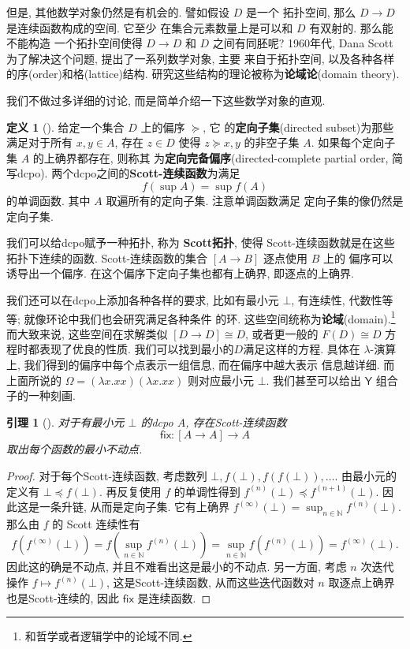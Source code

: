 \documentclass[UTF8]{ctexbook}
\newcommand{\cons}[1]{\textsf{#1}}
\theoremstyle{plain}
\newtheorem{lemma}{引理}[chapter]
\theoremstyle{definition}
\newtheorem{definition}{定义}[chapter]
\theoremstyle{remark}
\begin{document}
但是, 其他数学对象仍然是有机会的. 譬如假设 \(D\) 是一个
拓扑空间, 那么 \(D \to D\) 是连续函数构成的空间. 它至少
在集合元素数量上是可以和 \(D\) 有双射的. 那么能不能构造
一个拓扑空间使得 \(D \to D\) 和 \(D\) 之间有同胚呢?
1960年代, Dana Scott 为了解决这个问题, 提出了一系列数学对象, 主要
来自于拓扑空间, 以及各种各样的序(order)和格(lattice)结构.
研究这些结构的理论被称为\textbf{论域论}(domain theory).

我们不做过多详细的讨论, 而是简单介绍一下这些数学对象的直观.
\begin{definition}[{\cite[\S\S2.1.5--2.1.6]{abramsky:1995:domain}}]
给定一个集合 \(D\) 上的偏序 \(\succeq\), 它
的\textbf{定向子集}(directed subset)为那些满足对于所有 \(x,y\in A\),
存在 \(z \in D\) 使得 \(z \succeq x, y\) 的非空子集
\(A\). 如果每个定向子集 \(A\) 的上确界都存在, 则称其
为\textbf{定向完备偏序}(directed-complete partial order, 简写dcpo).
两个dcpo之间的\textbf{Scott-连续函数}为满足
\[f\left(\sup A\right) = \sup f(A)\]
的单调函数. 其中 \(A\) 取遍所有的定向子集. 注意单调函数满足
定向子集的像仍然是定向子集.
\end{definition}
我们可以给dcpo赋予一种拓扑, 称为 \textbf{Scott拓扑},
使得 Scott-连续函数就是在这些拓扑下连续的函数.
Scott-连续函数的集合 \([A \to B]\) 逐点使用 \(B\) 上的
偏序可以诱导出一个偏序. 在这个偏序下定向子集也都有上确界,
即逐点的上确界.

我们还可以在dcpo上添加各种各样的要求, 比如有最小元 \(\bot\),
有连续性, 代数性等等; 就像环论中我们也会研究满足各种条件
的环. 这些空间统称为\textbf{论域}(domain).\footnote{和哲学或者逻辑学中的论域不同.}
而大致来说, 这些空间在求解类似 \([D \to D] \cong D\),
或者更一般的 \(F(D) \cong D\) 方程时都表现了优良的性质.
我们可以找到最小的\(D\)满足这样的方程. 具体在 \(\lambda\)-演算
上, 我们得到的偏序中每个点表示一组信息, 而在偏序中越大表示
信息越详细. 而上面所说的 \(\Omega = (\lambda x. xx) (\lambda x.xx)\)
则对应最小元 \(\bot\). 我们甚至可以给出 \(\cons{Y}\)
组合子的一种刻画.
\begin{lemma}[{\cite[定理2.1.19]{abramsky:1995:domain}}]
对于有最小元 \(\bot\) 的dcpo \(A\),
存在Scott-连续函数 \[\cons{fix} : [A \to A] \to A\]
取出每个函数的最小不动点.
\end{lemma}
\begin{proof}
对于每个Scott-连续函数,
考虑数列 \(\bot, f(\bot), f(f(\bot)),\dots\).
由最小元的定义有 \(\bot \preceq f(\bot)\). 再反复使用
\(f\) 的单调性得到 \(f^{(n)}(\bot) \preceq f^{(n+1)}(\bot)\).
因此这是一条升链, 从而是定向子集. 它有上确界
\(f^{(\infty)}(\bot) = \sup_{n\in\mathbb N}f^{(n)}(\bot).\)
那么由 \(f\) 的 Scott 连续性有
\[f(f^{(\infty)}(\bot)) = f(\sup_{n\in\mathbb N}f^{(n)}(\bot))
= \sup_{n\in\mathbb N} f(f^{(n)}(\bot)) = f^{(\infty)}(\bot).\]
因此这的确是不动点, 并且不难看出这是最小的不动点.
另一方面, 考虑 \(n\) 次迭代操作 \(f \mapsto f^{(n)}(\bot)\),
这是Scott-连续函数, 从而这些迭代函数对 \(n\) 取逐点上确界
也是Scott-连续的, 因此 \(\cons{fix}\) 是连续函数.
\end{proof}
\end{document}
